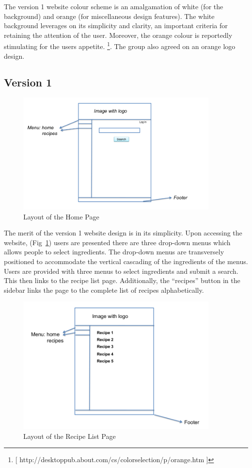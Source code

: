 The version 1 website colour scheme is an amalgamation of white (for the background) and orange (for miscellaneous design features). The white background leverages on its simplicity and clarity, an important criteria for retaining the attention of the user. Moreover, the orange colour is reportedly stimulating for the users appetite. \footnote{[ http://desktoppub.about.com/cs/colorselection/p/orange.htm ]}. The group also agreed on an orange logo design. 

\subsection{Version 1}

\begin{figure}
\includegraphics[width=0.9\textwidth]{home_page}
\caption{Layout of the Home Page}
\label{fig:home_page}
\end{figure}

The merit of the version 1 website design is in its simplicity. Upon accessing the website, (Fig~\ref{fig:home_page}) users are presented there are three drop-down menus which allows people to select ingredients. The drop-down menus are transversely positioned to accommodate the vertical cascading of the ingredients of the menus. Users are provided with three menus to select ingredients and submit a search. This then links to the recipe list page. Additionally, the “recipes” button in the sidebar links the page to the complete list of recipes alphabetically.

\begin{figure}
\includegraphics[width=0.9\textwidth]{recipe_list_page}
\caption{Layout of the Recipe List Page}
\label{fig:recipe_list}
\end{figure}

